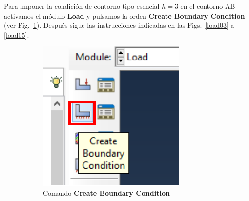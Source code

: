   Para imponer la condición de contorno tipo esencial $h=3$ en el
  contorno AB activamos el módulo \textbf{Load} y pulsamos la orden
  \textbf{Create Boundary Condition} (ver Fig.~\ref{load02}). Después
  sigue las instrucciones indicadas en las Figs.~\ref{load03} a
  \ref{load05}.

  \begin{figure}[!h]
    \centering
    \begin{subfigure}[!h]{0.25\textwidth}
      \includegraphics[width=\textwidth]{./body/images/load02.pdf}
      \caption{Comando \textbf{Create Boundary Condition}}
      \label{load02}
    \end{subfigure}%
    ~ %
    \begin{subfigure}[!h]{0.45\textwidth}

\end{subfigure}
\end{figure}
